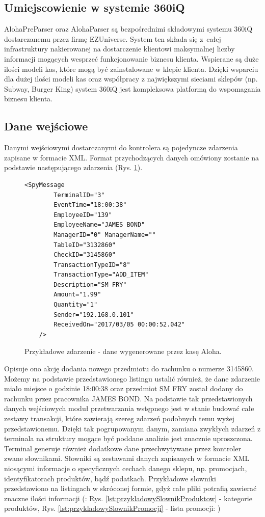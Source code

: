 \documentclass[a4paper]{book}
\begin{document}
\subsection{Umiejscowienie w systemie 360iQ}
AlohaPreParser oraz AlohaParser są bezpośrednimi składowymi systemu 360iQ dostarczanemu przez firmę EZUniverse. System ten składa się z~całej infrastruktury nakierowanej na dostarczenie klientowi maksymalnej liczby informacji mogących wesprzeć funkcjonowanie biznesu klienta. Wspierane są duże ilości modeli kas, które mogą być zainstalowane w klepie klienta. Dzięki wsparciu dla dużej ilości modeli kas oraz współpracy z największymi sieciami sklepów (np. Subway, Burger King) system 360iQ jest kompleksowa platformą do wspomagania biznesu klienta.
\subsection{Dane wejściowe}
Danymi wejściowymi dostarczanymi do kontrolera są pojedyncze zdarzenia zapisane w formacie XML.
Format przychodzących danych omówiony zostanie na podstawie następującego zdarzenia (Rys. \ref{lst:przykladoweZdarzenieAloha}).  
\begin{figure}[t]
	\begin{lstlisting}[frame=single, breaklines=true, numbers=none]
	<SpyMessage 
		TerminalID="3"
		EventTime="18:00:38" 
		EmployeeID="139" 
		EmployeeName="JAMES BOND" 
		ManagerID="0" ManagerName="" 
		TableID="3132860" 
		CheckID="3145860" 
		TransactionTypeID="8" 
		TransactionType="ADD_ITEM" 
		Description="SM FRY" 
		Amount="1.99" 
		Quantity="1" 
		Sender="192.168.0.101" 
		ReceivedOn="2017/03/05 00:00:52.042" 
	/>
	\end{lstlisting}
	\caption{Przykładowe zdarzenie - dane wygenerowane przez kasę Aloha.}
	\label{lst:przykladoweZdarzenieAloha}
\end{figure}
Opisuje ono akcję dodania nowego przedmiotu do rachunku o numerze 3145860. Możemy na podstawie przedstawionego listingu ustalić również, że dane zdarzenie miało miejsce o godzinie 18:00:38 oraz przedmiot SM FRY został dodany do rachunku przez pracownika JAMES BOND. Na podstawie tak przedstawionych danych wejściowych moduł przetwarzania wstępnego jest w stanie budować całe zestawy transakcji, które zawierają szereg zdarzeń podobnych temu wyżej przedstawionemu. Dzięki tak pogrupowanym danym, zamiana zwykłych zdarzeń z terminala na struktury mogące być poddane analizie jest znacznie uproszczona. Terminal generuje również dodatkowe dane przechwytywane przez kontroler zwane słownikami. Słowniki są zestawami danych zapisanych w formacie XML niosącymi informacje o specyficznych cechach danego sklepu, np. promocjach, identyfikatorach produktów, bądź podatkach. Przykładowe słowniki przedstawiono na listingach w skróconej formie, gdyż całe pliki potrafią zawierać znaczne ilości informacji (: Rys. \ref{lst:przykladowySlownikProduktow} - kategorie produktów, Rys. \ref{lst:przykladowySlownikPromocji} - lista promocji: )
\end{document}
